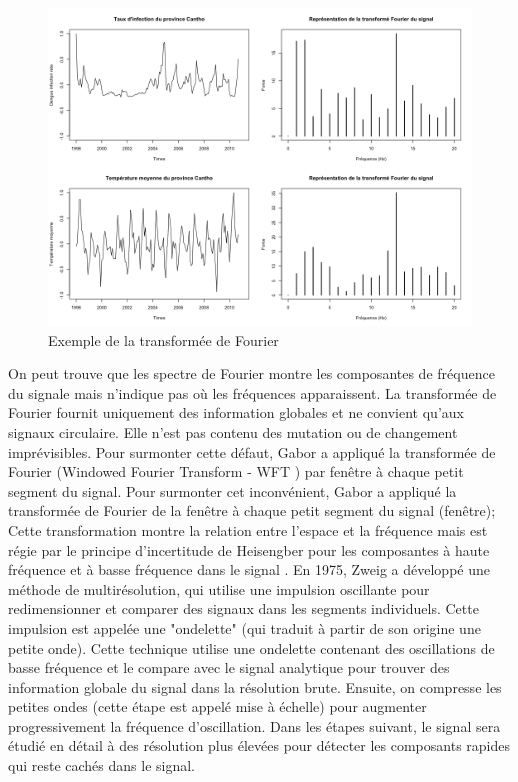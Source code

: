\begin{figure}[h]
\includegraphics[width = \linewidth]{../figures/chap4/Pic4_1.png}
\caption{Exemple de la transformée de Fourier}
\label{Pic4_1}	
\end{figure}

On peut trouve que les spectre de Fourier montre les composantes de fréquence du signale mais n'indique pas où les fréquences apparaissent. La transformée de Fourier fournit uniquement des information globales et ne convient qu'aux signaux circulaire. Elle n'est pas contenu des mutation ou de changement imprévisibles. Pour surmonter cette défaut, Gabor \cite{gabor1946} a appliqué la transformée de Fourier (Windowed Fourier Transform - WFT ) par fenêtre à chaque petit segment du signal. Pour surmonter cet inconvénient, Gabor a appliqué la transformée de Fourier de la fenêtre à chaque petit segment du signal (fenêtre); Cette transformation montre la relation entre l'espace et la fréquence mais est régie par le principe d'incertitude de Heisengber pour les composantes à haute fréquence et à basse fréquence dans le signal \cite{kaiser1994}. En 1975, Zweig a développé une méthode de multirésolution, qui utilise une impulsion oscillante pour redimensionner et comparer des signaux dans les segments individuels. Cette impulsion est appelée une "ondelette" (qui traduit à partir de son origine une petite onde). Cette technique utilise une ondelette contenant des oscillations de basse fréquence et le compare avec le signal analytique pour trouver des information globale du signal dans la résolution brute. Ensuite, on compresse les petites ondes (cette étape est appelé mise à échelle) pour augmenter progressivement la fréquence d'oscillation. Dans les étapes suivant, le signal sera étudié en détail à des résolution plus élevées pour détecter les composants rapides qui reste cachés dans le signal.

